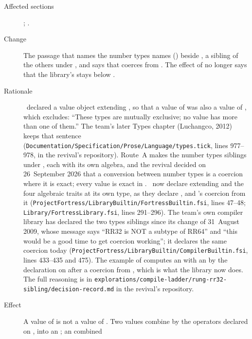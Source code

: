 \begin{description}
\item[Affected sections] ; .
\item[Change] The passage that names the number types names 
() beside , a sibling of the others under
, and says that  coerces from .
The effect of  no longer says that the library's
 stays below .
\item[Rationale] \Library\ declared  a value object extending
, so that a value of  was also a value of
, which  excludes: ``These types are
mutually exclusive; no value has more than one of them.''
The team's later Types chapter (Luchangco, 2012) keeps that sentence
(\nolinkurl{Documentation/Specification/Prose/Language/types.tick}, lines
977--978, in the revival's repository).
Route~A makes the number types siblings under , each with its own
algebra, and the revival decided on 26~September 2026 that a conversion between
number types is a coercion where it is exact; every  value is
exact in .
\Library\ now declare  extending  and the four
algebraic traits at its own type, as they declare , and
's coercion from it
(\nolinkurl{ProjectFortress/LibraryBuiltin/FortressBuiltin.fsi}, lines 47--48;
\nolinkurl{Library/FortressLibrary.fsi}, lines 291--296).
The team's own compiler library has declared the two types siblings since its
change of 31~August 2009, whose message says ``RR32 is NOT a subtype of RR64''
and ``this would be a good time to get coercion working''; it declares the same
coercion today (\nolinkurl{ProjectFortress/LibraryBuiltin/CompilerBuiltin.fsi},
lines 433--435 and 475).
The example of  computes an  with an
 by the declaration on  after a coercion from
, which is what the library now does.
The full reasoning is in
\nolinkurl{explorations/compile-ladder/rung-rr32-sibling/decision-record.md}
in the revival's repository.
\item[Effect] A value of  is not a value of .
Two  values combine by the operators declared on
, into an ; an  combined

\end{description}
